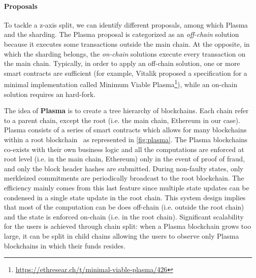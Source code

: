 \paragraph{Proposals} To tackle a z-axis split, we can identify different
proposals, among which Plasma and the sharding. The Plasma proposal is
categorized as an \emph{off-chain} solution because it executes some
transactions outside the main chain. At the opposite, in which the sharding
belongs, the \emph{on-chain} solutions execute every transaction on the main
chain. Typically, in order to apply an off-chain solution, one or more smart
contracts are sufficient (for example, Vitalik proposed a specification for a
minimal implementation called Minimum Viable
Plasma\footnote{\url{https://ethresear.ch/t/minimal-viable-plasma/426}}), while
an on-chain solution requires an hard-fork.

The idea of \textbf{Plasma} is to create a tree hierarchy of blockchains. Each chain
refer to a parent chain, except the root (i.e. the main chain, Ethereum in our
case). Plasma consists of a series of smart contracts which allows for many
blockchains within a root blockchain~\cite{poon2017plasma} as represented in
\autoref{fig:plasma}. The Plasma blockchains co-exists with their own business
logic and all the computations are enforced at root level (i.e. in the main
chain, Ethereum) only in the event of proof of fraud, and only the block header
hashes are submitted. During non-faulty states, only merkleized commitments are
periodically broadcast to the root blockchain. The efficiency mainly comes from
this last feature since multiple state updates can be condensed in a single
state update in the root chain. This system design implies that most of the
computation can be does off-chain (i.e. outside the root chain) and the state is
enforced on-chain (i.e. in the root chain). Significant scalability for the
users is achieved through chain split: when a Plasma blockchain grows too large,
it can be split in child chains allowing the users to observe only Plasma
blockchains in which their funds resides.

